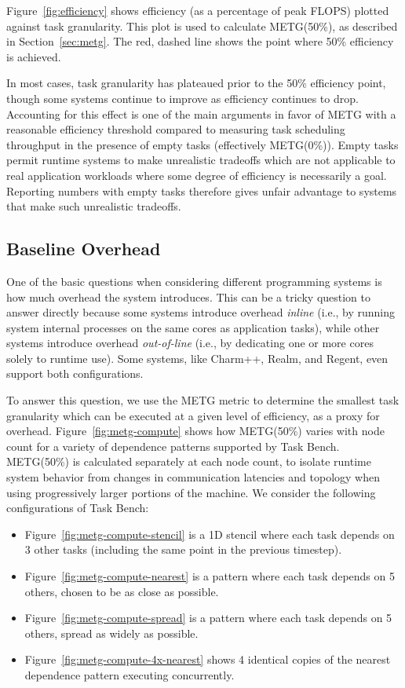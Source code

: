 Figure~\ref{fig:efficiency} shows efficiency (as a percentage of
peak FLOPS) plotted against task granularity. This plot is
used to calculate METG(50\%), as described in Section~\ref{sec:metg}. The
red, dashed line shows the point where 50\% efficiency is achieved.

In most cases, task granularity has plateaued prior to the 50\% efficiency point,
though some systems continue to improve as efficiency continues
to drop. Accounting for this effect is one of the main arguments in
favor of METG with a reasonable efficiency threshold compared to
measuring task scheduling throughput in the presence of empty tasks
(effectively METG(0\%)). Empty tasks permit runtime
systems to make unrealistic tradeoffs which are not applicable to real
application workloads where some degree of efficiency is necessarily a
goal. Reporting numbers with empty tasks therefore gives unfair
advantage to systems that make such unrealistic tradeoffs.

\subsection{Baseline Overhead}

One of the basic questions when considering different programming
systems is how much overhead the system introduces. This can be a
tricky question to answer directly because some systems introduce
overhead \emph{inline} (i.e., by running system internal processes on
the same cores as application tasks), while other systems introduce
overhead \emph{out-of-line} (i.e., by dedicating one or more cores
solely to runtime use). Some systems, like Charm++, Realm, and Regent,
even support both configurations.

To answer this question, we use the METG metric to determine the
smallest task granularity which can be executed at a given level of
efficiency, as a proxy for overhead. Figure~\ref{fig:metg-compute}
shows how METG(50\%) varies with node count for a variety of
dependence patterns supported by Task Bench. METG(50\%) is calculated
separately at each node count, to isolate runtime system behavior from
changes in communication latencies and topology when using
progressively larger portions of the machine. We consider the
following configurations of Task Bench:

\begin{itemize}
\item Figure~\ref{fig:metg-compute-stencil} is a 1D stencil where each
  task depends on 3 other tasks (including the same point in the
  previous timestep).
\item Figure~\ref{fig:metg-compute-nearest} is a pattern where each
  task depends on 5 others, chosen to be as close as possible.
\item Figure~\ref{fig:metg-compute-spread} is a pattern where each
  task depends on 5 others, spread as widely as possible.
\item Figure~\ref{fig:metg-compute-4x-nearest} shows 4 identical
  copies of the nearest dependence pattern executing concurrently.
\end{itemize}

